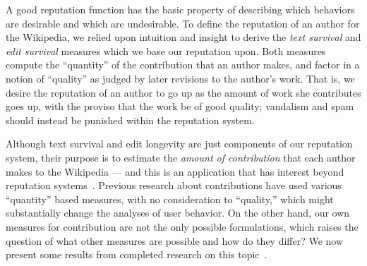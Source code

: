 
A good reputation function has the basic property
of describing which behaviors are desirable
and which are undesirable.
To define the reputation of an author for the Wikipedia, we relied upon
intuition and insight to derive the \textit{text survival}
and \textit{edit survival} measures which we base our reputation upon.
Both measures compute the ``quantity'' of the contribution
that an author makes, and factor
in a notion of ``quality'' as judged by later revisions
to the author's work.
That is, we desire the reputation of an author to go up
as the amount of work she contributes goes up,
with the proviso that the work be of good quality;
vandalism and spam should instead be punished within
the reputation system.

Although text survival and edit longevity are just components of our reputation
system, their purpose is to estimate the \textit{amount of contribution}
that each author makes to the Wikipedia --- and this is an
application that has interest beyond reputation
systems~\cite{Wales2005,EditsEqQuality2007,
Bourgeoisie2007,WikiDashboard2008,OrtegaBarahona2007,SteinHess2007,
Swartz2006}.
Previous research about contributions have used various
``quantity'' based measures, with no consideration to ``quality,''
which might substantially change the analyses of user behavior.
On the other hand, our own measures for contribution are
not the only possible formulations, which raises the question
of what other measures are possible and how do they differ?
We now present some results from completed research on this topic~\cite{AuthorContrib2008}.

